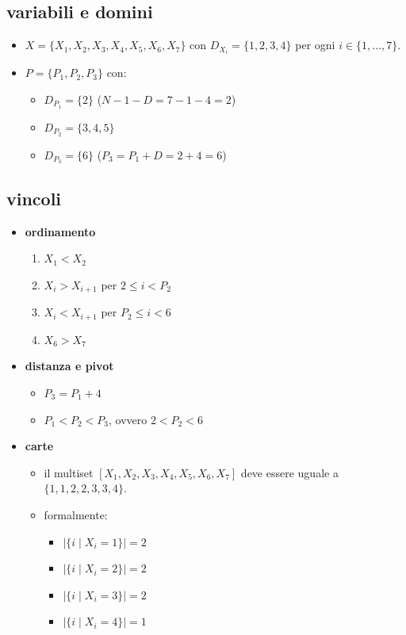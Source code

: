 \documentclass[12pt]{article}
\begin{document}
\subsection*{variabili e domini}
\begin{itemize}
    \item $X = \{X_1, X_2, X_3, X_4, X_5, X_6, X_7\}$ con $D_{X_i} = \{1, 2, 3, 4\}$ per ogni $i \in \{1, \dots, 7\}$.
    \item $P = \{P_1, P_2, P_3\}$ con:
    \begin{itemize}
        \item $D_{P_1} = \{2\}$ ($N - 1 - D = 7 - 1 - 4 = 2$)
        \item $D_{P_2} = \{3, 4, 5\}$
        \item $D_{P_3} = \{6\}$ ($P_3 = P_1 + D = 2 + 4 = 6$)
    \end{itemize}
\end{itemize}

\subsection*{vincoli}
\begin{itemize}
\item \textbf{ordinamento}
    \begin{enumerate}
        \item $X_1 < X_{2}$         
        \item $X_i > X_{i+1}$ per $2 \leq i < P_2$
        \item $X_i < X_{i+1}$ per $P_2 \leq i < 6$
        \item $X_6 > X_{7}$
    \end{enumerate}

    \item \textbf{distanza e pivot}
    \begin{itemize}
        \item $P_3 = P_1 + 4$
        \item $P_1 < P_2 < P_3$, ovvero $2 < P_2 < 6$
    \end{itemize}

    \item \textbf{carte}
        \begin{itemize}
            \item il multiset $[X_1, X_2, X_3, X_4, X_5, X_6, X_7]$ deve essere uguale a $\{1, 1, 2, 2, 3, 3, 4\}$.
        \item formalmente:
        \begin{itemize}
            \item $|\{i \mid X_i = 1\}| = 2$
            \item $|\{i \mid X_i = 2\}| = 2$
            \item $|\{i \mid X_i = 3\}| = 2$
            \item $|\{i \mid X_i = 4\}| = 1$
        \end{itemize}
    \end{itemize}
\end{itemize}
\end{document}
